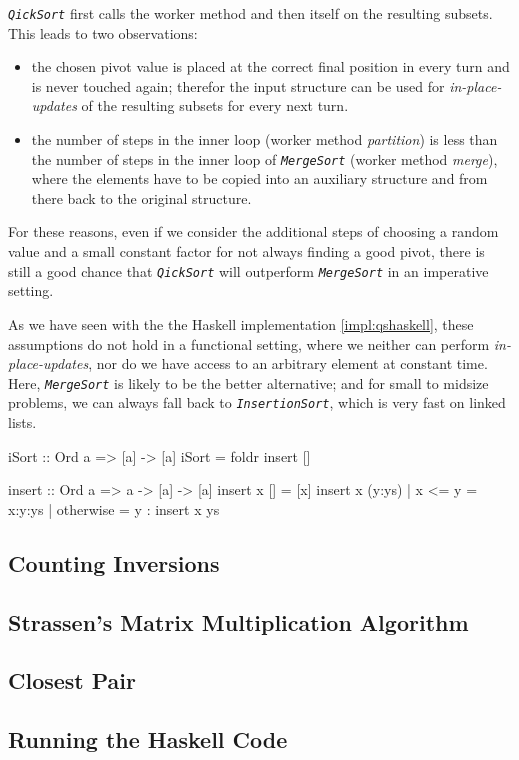 \emph{\texttt{QickSort}} first calls the worker method and then itself on the resulting subsets.
This leads to two observations:
\begin{itemize}
    \item the chosen pivot value is placed at the correct final position in every turn and is never touched again; therefor the input structure can be used for \emph{in-place-updates} of the resulting subsets for every next turn.
    \item the number of steps in the inner loop (worker method \emph{partition}) is less than the number of steps in the inner loop of \emph{\texttt{MergeSort}} (worker method \emph{merge}), where the elements have to be copied into an auxiliary structure and from there back to the original structure.
\end{itemize}

For these reasons, even if we consider the additional steps of choosing a random value and a small constant factor for not always finding a good pivot, there is still a good chance that \emph{\texttt{QickSort}} will outperform \emph{\texttt{MergeSort}} in an imperative setting.

As we have seen with the the Haskell implementation \ref{impl:qshaskell}, these assumptions do not hold in a functional setting, where we neither can perform \emph{in-place-updates}, nor do we have access to an arbitrary element at constant time. Here, \emph{\texttt{MergeSort}} is likely to be the better alternative; and for small to midsize problems, we can always fall back to \emph{\texttt{InsertionSort}}, which is very fast on linked lists.

\begin{impl}
\end{impl}

\begin{haskellcode}
  iSort :: Ord a => [a] -> [a]
  iSort = foldr insert []

  insert :: Ord a => a -> [a] -> [a]
  insert x [] = [x]
  insert x (y:ys) | x <= y = x:y:ys
                  | otherwise = y : insert x ys
\end{haskellcode}

\subsection{Counting Inversions}

\subsection{Strassen's Matrix Multiplication Algorithm}

\subsection{Closest Pair}

\subsection{Running the Haskell Code}

